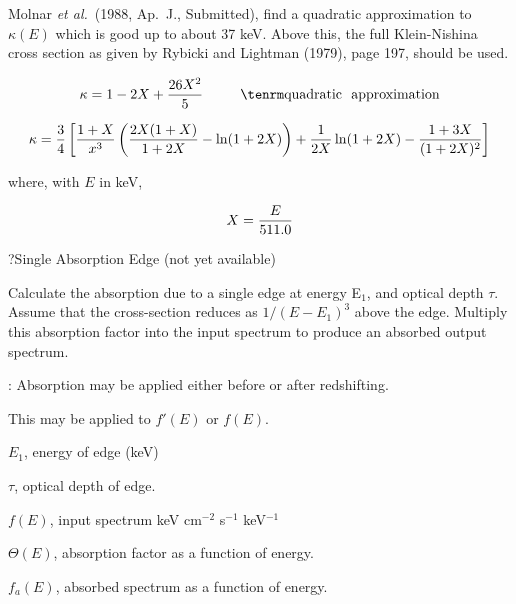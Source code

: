\itemitem{}Molnar {\it et al.}~(1988, Ap.~J., Submitted), find a quadratic
approximation to $\kappa(E)$ which is good up to about 37 keV.  Above
this,
the full Klein-Nishina cross section as  given by Rybicki and Lightman
(1979), page 197, should be used.

$$\kappa = 1- 2X + {26 X^2 \over 5} ~~~~~~~~{\rm quadratic~~approximation}$$

$$\kappa = {3 \over 4} \left[ {{1+X} \over x^3} \left( {{2 X (1+X)} \over
{1+ 2X} } - \ln (1 + 2X) \right) + {1 \over {2X}} \ln (1+2X)
- {{1+3X} \over (1+2X)^2}\right]$$

\itemitem{}where, with $E$ in keV,

$$X = {E \over 511.0}$$

\centerline{}
\vskip 18pt
\centerline{}

{\parindent
\vbox{}}

\par\vfill\eject
 
\??Single Absorption Edge (not yet available)

{\listlist
 

Calculate the absorption due to a single edge at energy E$_{1}$, and optical
depth $\tau$.  Assume that the cross-section reduces as $1/(E-E_{1})^{3}$ above
the edge.  Multiply this absorption factor into the input spectrum to produce
an absorbed output spectrum.

:  Absorption may be applied either before or after redshifting.
 
This may be applied to $f'(E)$ or $f(E)$.


$E_1$, energy of edge (keV)

$\tau$, optical depth of edge.

$f(E)$, input spectrum keV cm$^{-2}$ s$^{-1}$ keV$^{-1}$
 
 
$\Theta (E)$, absorption factor as a function of energy.
 
$f_a(E)$, absorbed spectrum as a function of energy.


}


